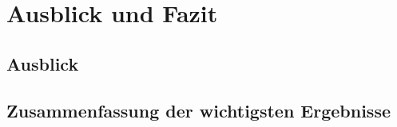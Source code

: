 \chapter{Ausblick und Fazit}\label{cha:AusblickUndFazit}

\lipsum[6]

\section{Ausblick}\label{sec:Ausblick}

\lipsum[6]

\section{Zusammenfassung der wichtigsten Ergebnisse}\label{sec:ZusammenfassungErgebnisse}

\lipsum[6]

